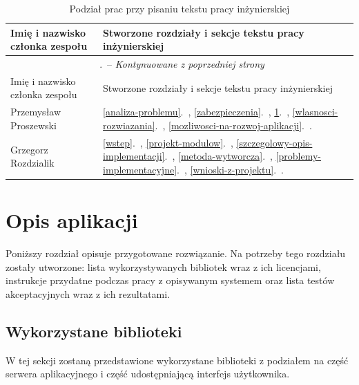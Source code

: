 \documentclass[a4paper,11pt,twoside]{report}
\renewcommand*{\thetable}{\arabic{chapter}.\arabic{table}}
\theoremstyle{definition}
\begin{document}
    \begin{longtable}{| p{} | p{} |}
        \caption{Podział prac przy pisaniu tekstu pracy inżynierskiej}
        \label{podzial-prac-tekst-pracy} \\
        \hline
        Imię i nazwisko członka zespołu & Stworzone rozdziały i sekcje tekstu pracy inżynierskiej \\ \hline
        \endfirsthead
        \multicolumn{2}{c}{\tablename\ \thetable\ -- \textit{Kontynuowane z poprzedniej strony}} \\
        \hline
        Imię i nazwisko członka zespołu & Stworzone rozdziały i sekcje tekstu pracy inżynierskiej \\ \hline
        \endhead
        
        Przemysław Proszewski &
        \ref{analiza-problemu}.~\nameref{analiza-problemu},
        \ref{zabezpieczenia}.~\nameref{zabezpieczenia},
        \ref{opis-aplikacji}.~\nameref{opis-aplikacji},
        \ref{wlasnosci-rozwiazania}.~\nameref{wlasnosci-rozwiazania},
        \ref{mozliwosci-na-rozwoj-aplikacji}.~\nameref{mozliwosci-na-rozwoj-aplikacji}. \\ \hline
        
        Grzegorz Rozdzialik &
        \ref{wstep}.~\nameref{wstep},
        \ref{projekt-modulow}.~\nameref{projekt-modulow},
        \ref{szczegolowy-opis-implementacji}.~\nameref{szczegolowy-opis-implementacji},
        \ref{metoda-wytworcza}.~\nameref{metoda-wytworcza},
        \ref{problemy-implementacyjne}.~\nameref{problemy-implementacyjne},
        \ref{wnioski-z-projektu}.~\nameref{wnioski-z-projektu}. \\ \hline
    \end{longtable}

\chapter{Opis aplikacji}
    \label{opis-aplikacji}
    Poniższy rozdział opisuje przygotowane rozwiązanie. Na potrzeby tego rozdziału zostały utworzone: lista wykorzystywanych bibliotek wraz z ich licencjami, instrukcje przydatne podczas pracy z opisywanym systemem oraz lista testów akceptacyjnych wraz z ich rezultatami.
    
    \section{Wykorzystane biblioteki}
         W tej sekcji zostaną przedstawione wykorzystane biblioteki z podziałem na część serwera aplikacyjnego i część udostępniającą interfejs użytkownika.
        
\end{document}
